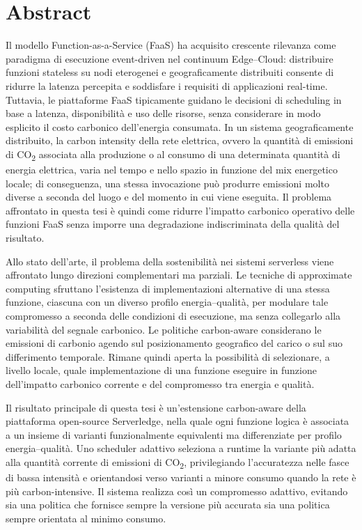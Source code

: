 \chapter*{Abstract}

Il modello Function-as-a-Service (FaaS) ha acquisito crescente rilevanza come
paradigma di esecuzione event-driven nel continuum
Edge--Cloud: distribuire funzioni
stateless su nodi eterogenei e geograficamente distribuiti consente di ridurre la
latenza percepita e soddisfare i requisiti di applicazioni real-time.
Tuttavia, le piattaforme FaaS tipicamente guidano le decisioni di scheduling in
base a latenza, disponibilità e uso delle risorse, senza considerare in modo
esplicito il costo carbonico dell'energia consumata.
In un sistema geograficamente distribuito, la carbon intensity della rete
elettrica, ovvero la quantità di emissioni di CO\textsubscript{2} associata
alla produzione o al consumo di una determinata quantità di energia elettrica,
varia nel tempo e nello spazio in funzione del mix energetico locale; di
conseguenza, una stessa invocazione può produrre emissioni molto diverse a
seconda del luogo e del momento in cui viene eseguita. Il problema affrontato
in questa tesi è quindi come ridurre l'impatto carbonico operativo delle
funzioni FaaS senza imporre una degradazione indiscriminata della qualità del
risultato.

Allo stato dell'arte, il problema della sostenibilità nei sistemi serverless
viene affrontato lungo direzioni complementari ma parziali. Le tecniche di
approximate computing sfruttano l'esistenza di implementazioni alternative di
una stessa funzione, ciascuna con un diverso profilo energia--qualità, per
modulare tale compromesso a seconda delle condizioni di esecuzione, ma senza
collegarlo alla variabilità del segnale carbonico. Le politiche carbon-aware
considerano le emissioni di carbonio agendo sul posizionamento geografico del
carico o sul suo differimento temporale. Rimane quindi aperta la possibilità di
selezionare, a livello locale, quale implementazione di una funzione eseguire
in funzione dell'impatto carbonico corrente e del compromesso tra energia e
qualità.

Il risultato principale di questa tesi è un'estensione carbon-aware della
piattaforma open-source Serverledge, nella quale ogni funzione logica è
associata a un insieme di varianti funzionalmente equivalenti ma differenziate
per profilo energia--qualità. Uno scheduler adattivo seleziona a runtime la
variante più adatta alla quantità corrente di emissioni di CO\textsubscript{2},
privilegiando l'accuratezza nelle fasce di bassa intensità e orientandosi
verso varianti a minore consumo quando la rete è più carbon-intensive. Il
sistema realizza così un compromesso adattivo, evitando sia una politica che
fornisce sempre la versione più accurata sia una politica sempre orientata al
minimo consumo.

